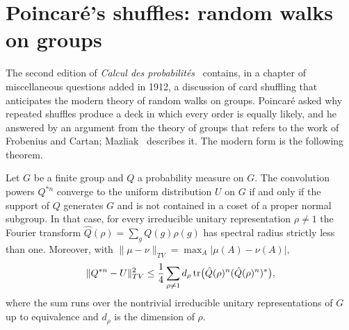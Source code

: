 \section{Poincar\'e's shuffles: random walks on groups}

The second edition of \emph{Calcul des probabilit\'es}~\cite{poincare1912calcul} contains, in a chapter of miscellaneous questions added in 1912, a discussion of card shuffling that anticipates the modern theory of random walks on groups. Poincar\'e asked why repeated shuffles produce a deck in which every order is equally likely, and he answered by an argument from the theory of groups that refers to the work of Frobenius and Cartan; Mazliak~\cite{mazliak2012} describes it. The modern form is the following theorem.

\begin{theorem}
\label{thm:random_walk_groups}
Let $G$ be a finite group and $Q$ a probability measure on $G$. The convolution powers $Q^{*n}$ converge to the uniform distribution $U$ on $G$ if and only if the support of $Q$ generates $G$ and is not contained in a coset of a proper normal subgroup. In that case, for every irreducible unitary representation $\rho\neq1$ the Fourier transform $\hat Q(\rho) = \sum_gQ(g)\rho(g)$ has spectral radius strictly less than one. Moreover, with $\|\mu-\nu\|_{TV} = \max_A|\mu(A)-\nu(A)|$,
\[
\|Q^{*n}-U\|_{TV}^2\leq\frac14\sum_{\rho\neq1}d_\rho\,\mathrm{tr}\big(\hat Q(\rho)^n(\hat Q(\rho)^n)^*\big),
\]
where the sum runs over the nontrivial irreducible unitary representations of $G$ up to equivalence and $d_\rho$ is the dimension of $\rho$.
\end{theorem}

